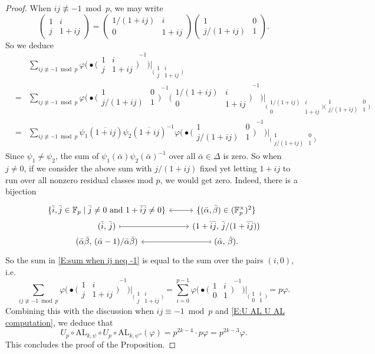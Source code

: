 \documentclass[12pt]{amsart}
\theoremstyle{definition}
\numberwithin{equation}{subsection}
\def\FF{\mathbb{F}}
\newcommand{\AL}{\mathrm{AL}}
\newcommand{\Matrix}[4]{{\big(\begin{smallmatrix}#1&#2\\#3& #4\end{smallmatrix} \big)}}
\newcommand{\MATRIX}[4]{{\begin{pmatrix}#1&#2\\#3& #4\end{pmatrix}}}
\begin{document}
\begin{proof}
When $ij \not\equiv -1 \bmod p$, we may write
$$\MATRIX 1ij{1+ij}  = \MATRIX {1/(1+ij)}i0{1+ij} \MATRIX 10{j/(1+ij)} 1.$$
So we deduce
\begin{eqnarray}
\label{E:sum when ij neq -1}
&&\sum_{ij \not\equiv -1 \bmod p} \varphi \big(\bullet {\Matrix 1ij{1+ij}}^{-1} \big) \big|_{\Matrix 1ij{1+ij}}
\\
\nonumber
&=& \sum_{ij \not\equiv -1 \bmod p} \varphi \big(\bullet {{\Matrix 10{j/(1+ij)} 1}^{-1}\Matrix{1/(1+ij)}i0{1+ij}}^{-1} \big) \big|_{\Matrix {1/(1+ij)}i0{1+ij} \Matrix 10{j/(1+ij)} 1}
\\
\nonumber
& = &
\sum_{ij \not\equiv -1 \bmod p} \psi_1(\overline{1+ij})\psi_2(\overline{1+ij})^{-1} \varphi \big(\bullet {\Matrix 10{j/(1+ij)} 1}^{-1} \big) \big|_{ \Matrix 10{j/(1+ij)} 1}
\end{eqnarray}
Since $\psi_1 \neq \psi_2$, the sum of $\psi_1(\bar \alpha) \psi_2(\bar\alpha)^{-1}$ over all $\bar \alpha  \in \Delta$ is zero. So when $j \neq 0$, if we consider the above sum with $j/(1+ij)$ fixed yet letting $1+ij$ to run over all nonzero residual classes mod $p$,
we would get zero. 
Indeed, there is a bijection
$$
\begin{tikzcd}[row sep = 0pt]
\{\bar i, \bar j \in \FF_p \;|\; \bar j \neq 0 \textrm{ and }1+\bar i \bar j \neq 0 \} \ar[r, leftrightarrow] & \{( \bar \alpha, \bar \beta) \in (\FF_p^\times)^2\}
\\
(\bar i,\, \bar j) \ar[r, mapsto] &  (1+ \bar i \bar j,\, \bar j / (1+\bar i \bar j))
\\
(\bar\alpha \bar \beta,\, (\bar \alpha-1) / \bar \alpha \bar \beta ) & \ar[l, mapsto] (\bar \alpha,\, \bar \beta).
\end{tikzcd}
$$
So the sum in \eqref{E:sum when ij neq -1} is equal to the sum over the pairs $(i,0)$, i.e.
$$\sum_{ij \not\equiv -1 \bmod p} \varphi \big(\bullet {\Matrix 1ij{1+ij}}^{-1} \big) \big|_{\Matrix 1ij{1+ij}} = \sum_{i =0}^{p-1} \varphi \big(\bullet {\Matrix 1i0{1}}^{-1} \big) \big|_{\Matrix 1i0{1}} = p \varphi.
$$
Combining this with the discussion when $ij \equiv -1 \bmod p$ and \eqref{E:U AL U AL computation}, we deduce that
$$U_p \circ \AL_{k, \psi} \circ U_p \circ  \AL_{k, \psi''} (\varphi) = p^{2k-4} \cdot p \varphi = p^{2k-3} \varphi.$$
This concludes the proof of the Proposition.
\end{proof}
\end{document}
